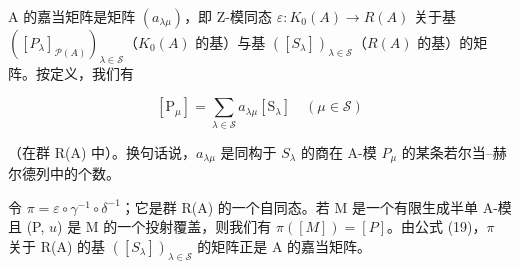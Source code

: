 A 的嘉当矩阵是矩阵 \((a_{\lambda\mu})\)，即 Z-模同态 \(\varepsilon: K_{0}(A) \to R(A)\) 关于基 \(([P_{\lambda}]_{\mathcal{P}(A)})_{\lambda \in \mathcal{S}}\)（\(K_{0}(A)\) 的基）与基 \(([S_{\lambda}])_{\lambda \in \mathcal{S}}\)（\(R(A)\) 的基）的矩阵。按定义，我们有

\[
[ \mathrm{P} _ {\mu} ] = \sum_ {\lambda \in \mathcal {S}} a _ {\lambda \mu} [ \mathrm{S} _ {\lambda} ] \quad (\mu \in \mathcal {S})\tag{19}
\]

（在群 R(A) 中）。换句话说，\(a_{\lambda\mu}\) 是同构于 \(S_{\lambda}\) 的商在 A-模 \(P_{\mu}\) 的某条若尔当–赫尔德列中的个数。

令 \(\pi = \varepsilon \circ \gamma^{-1} \circ \delta^{-1}\)；它是群 R(A) 的一个自同态。若 M 是一个有限生成半单 A-模且 (P, \(u\)) 是 M 的一个投射覆盖，则我们有 \(\pi([M]) = [P]\)。由公式 (19)，\(\pi\) 关于 R(A) 的基 \(([S_{\lambda}])_{\lambda \in \mathcal{S}}\) 的矩阵正是 A 的嘉当矩阵。

